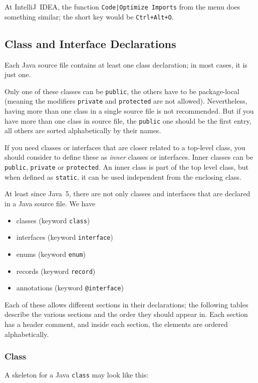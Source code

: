 \documentclass[11pt,a4paper, titlepage, parskip=half, headsepline, footsepline, cleardoublepage=current, headheight=1cm]{scrbook}
\begin{document}
At IntelliJ~IDEA, the function \verb#Code|Optimize Imports# from the menu does something similar; the short key would be \verb#Ctrl+Alt+O#.

\subsection{Class and Interface Declarations}\label{sec:ClassAndInterfaceDeclarations}
Each Java source file contains at least one class declaration; in most cases, it is just one.

Only one of these classes can be \lstinline|public|, the others have to be package-local (meaning the modifiers \lstinline|private| and \lstinline|protected| are not allowed). Nevertheless, having more than one class in a single source file is not recommended. But if you have more than one class in source file, the \lstinline|public| one should be the first entry, all others are sorted alphabetically by their names.

If you need classes or interfaces that are closer related to a top-level class, you should consider to define these as \textit{inner} classes or interfaces. Inner classes can be \lstinline|public|, \lstinline|private| or \lstinline|protected|. An inner class is part of the top level class, but when defined as \lstinline|static|, it can be used independent from the enclosing class.

At least since Java~5, there are not only classes and interfaces that are declared in a Java source file. We have

\begin{itemize}[nosep]
\item{classes (keyword \lstinline|class|)}
\item{interfaces (keyword \lstinline|interface|)}
\item{enums (keyword \lstinline|enum|)}
\item{records (keyword \lstinline|record|)}
\item{annotations (keyword \lstinline|@interface|)}
\end{itemize}

Each of these allows different sections in their declarations; the following tables describe the various sections and the order they should appear in. Each section has a header comment, and inside each section, the elements are ordered alphabetically.

\subsubsection{Class}
A skeleton for a Java \lstinline|class| may look like this:
\end{document}
